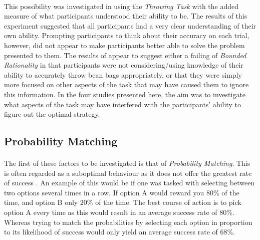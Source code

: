 \documentclass[12pt]{article}
\begin{document}
\paragraph{} This possibility was investigated in \cite{James2017} using the \textit{Throwing Task} with the added measure of what participants understood their ability to be.  The results of this experiment suggested that all participants had a very clear understanding of their own ability. Prompting participants to think about their accuracy on each trial, however, did not appear to make participants better able to solve the problem presented to them. The results of \cite{James2017} appear to suggest either a failing of \textit{Bounded Rationality} in that participants were not considering/using knowledge of their ability to accurately throw bean bags appropriately, or that they were simply more focused on other aspects of the task that may have caused them to ignore this information. In the four studies presented here, the aim was to investigate what aspects of the task may have interfered with the participants' ability to figure out the optimal strategy. 


\subsection*{Probability Matching}
\paragraph{} The first of these factors to be investigated is that of \textit{Probability Matching}. This is often regarded as a suboptimal behaviour as it does not offer the greatest rate of success \citep{Koehler2010}. An example of this would be if one was tasked with selecting between two options several times in a row. If option A would reward you 80\% of the time, and option B only 20\% of the time. The best course of action is to pick option A every time as this would result in an average success rate of 80\%. Whereas trying to match the probabilities by selecting each option in proportion to its likelihood of success would only yield an average success rate of 68\%.
\end{document}
